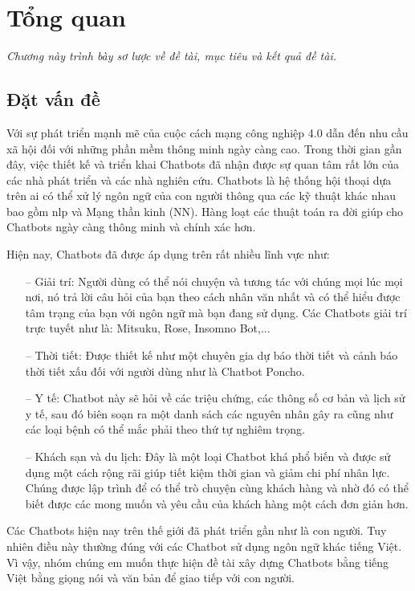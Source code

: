 \chapter{Tổng quan}
\label{Chapter1}

\emph{Chương này trình bày sơ lược về đề tài, mục tiêu và kết quả đề tài.}

\section{Đặt vấn đề}
Với sự phát triển mạnh mẽ của cuộc cách mạng công nghiệp 4.0 dẫn đến nhu cầu xã hội đối với những phần mềm thông minh ngày càng cao. Trong thời gian gần đây, việc thiết kế và triển khai Chatbots đã nhận được sự quan tâm rất lớn của các nhà phát triển và các nhà nghiên cứu. Chatbots là hệ thống hội thoại dựa trên \ac{ai} có thể xử lý ngôn ngữ của con người thông qua các kỹ thuật khác nhau bao gồm \ac{nlp} và Mạng thần kinh (NN). Hàng loạt các thuật toán ra đời giúp cho Chatbots ngày càng thông minh và chính xác hơn.

Hiện nay, Chatbots đã được áp dụng trên rất nhiều lĩnh vực như:
\begin{itemize}
    \item[--] Giải trí: Người dùng có thể nói chuyện và tương tác với chúng mọi lúc mọi nơi, nó trả lời câu hỏi của bạn theo cách nhân văn nhất và có thể hiểu được tâm trạng của bạn với ngôn ngữ mà bạn đang sử dụng. Các Chatbots giải trí trực tuyết như là: Mitsuku, Rose, Insomno Bot,...
    \item[--] Thời tiết: Được thiết kế như một chuyên gia dự báo thời tiết và cảnh báo thời tiết xấu đối với người dùng như là Chatbot Poncho.
    \item[--] Y tế: Chatbot này sẽ hỏi về các triệu chứng, các thông số cơ bản và lịch sử y tế, sau đó biên soạn ra một danh sách các nguyên nhân gây ra cũng như các loại bệnh có thể mắc phải theo thứ tự nghiêm trọng.
    \item[--] Khách sạn và du lịch: Đây là một loại Chatbot khá phổ biến và được sử dụng một cách rộng rãi giúp tiết kiệm thời gian và giảm chi phí nhân lực. Chúng được lập trình để có thể trò chuyện cùng khách hàng và nhờ đó có thể biết được các mong muốn và yêu cầu của khách hàng một cách đơn giản hơn.
\end{itemize}

Các Chatbots hiện nay trên thế giới đã phát triển gần như là con người. Tuy nhiên điều này thường đúng với các Chatbot sử dụng ngôn ngữ khác tiếng Việt. Vì vậy, nhóm chúng em muốn thực hiện đề tài xây dựng Chatbots bằng tiếng Việt bằng giọng nói và văn bản để giao tiếp với con người.


